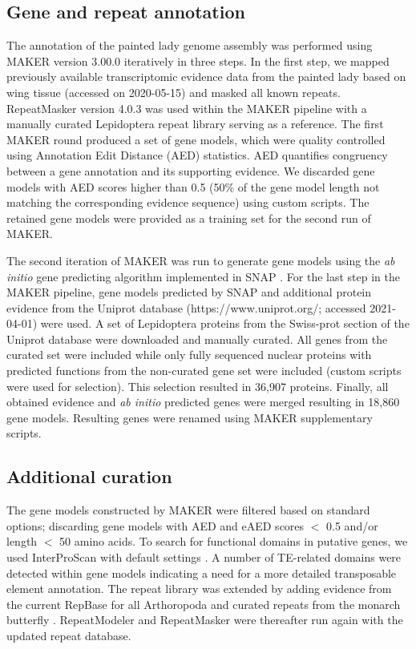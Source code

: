 \documentclass[twocolumn]{bmcart}%
\begin{document}
\subsection*{Gene and repeat annotation}
The annotation of the painted lady genome assembly was performed using MAKER version 3.00.0 \citep{holtMAKER2AnnotationPipeline2011} iteratively in three steps. In the first step, we mapped previously available transcriptomic evidence data from the painted lady based on wing tissue  \citep{connahsTranscriptomeAnalysisPainted2016a}(accessed on 2020-05-15) and masked all known repeats. RepeatMasker version 4.0.3 \citep{smitRepeatMaskerOpen42013} was used within the MAKER pipeline with a manually curated Lepidoptera repeat library  \citep{tallaRapidIncreaseGenome2017} serving as a reference. The first MAKER round produced a set of gene models, which were quality controlled using Annotation Edit Distance (AED) statistics. AED quantifies congruency between a gene annotation and its supporting evidence. We discarded gene models with AED scores higher than 0.5 (50\% of the gene model length not matching the corresponding evidence sequence) using custom scripts. The retained gene models were provided as a training set for the second run of MAKER.

The second iteration of MAKER was run to generate gene models using the \textit{ab initio} gene predicting algorithm implemented in SNAP \citep{korfGeneFindingNovel2004}. For the last step in the MAKER pipeline, gene models predicted by SNAP and additional protein evidence from the Uniprot database (https://www.uniprot.org/; accessed 2021-04-01) were used. A set of Lepidoptera proteins from the Swiss-prot section of the Uniprot database were downloaded and manually curated. All genes from the curated set were included while only fully sequenced nuclear proteins with predicted functions from the non-curated gene set were included (custom scripts were used for selection). This selection resulted in 36,907 proteins. Finally, all obtained evidence and \textit{ab initio} predicted genes were merged resulting in 18,860 gene models. Resulting genes were renamed using MAKER supplementary scripts.
\subsection*{Additional curation}  
The gene models constructed by MAKER were filtered based on standard options; discarding gene models with AED and eAED scores $<$ 0.5 and/or length $<$ 50 amino acids. To search for functional domains in putative genes, we used InterProScan with default settings \citep{jonesInterProScanGenomescaleProtein2014}. A number of TE-related domains were detected within gene models indicating a need for a more detailed transposable element annotation. The repeat library was extended by adding evidence from the current RepBase for all Arthoropoda \citep{baoRepbaseUpdateDatabase2015} and curated repeats from the monarch butterfly \citep{zhanMonarchBaseMonarchButterfly2013}. RepeatModeler and RepeatMasker \citep{holtMAKER2AnnotationPipeline2011} were thereafter run again with the updated repeat database.
\end{document}
